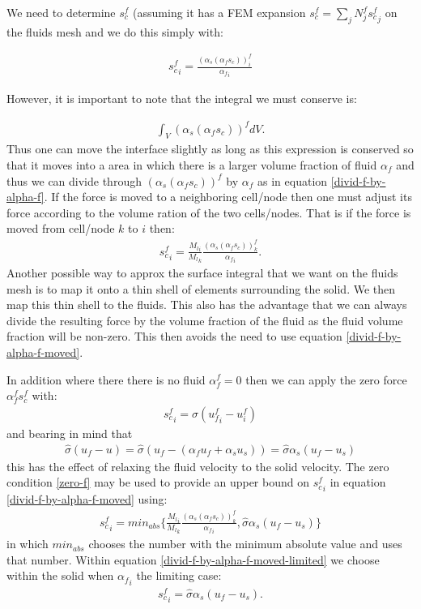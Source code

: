 We need to determine $s_c^f$ (assuming it has a FEM expansion 
$s_c^f=\sum_j N_j^f {s_c^f}_j$ on the fluids mesh and we 
do this simply with: 

\begin{eqnarray}
{s_c^f}_i= \frac{(\alpha_s(\alpha_f s_c))^f_i}{{\alpha_f}_i}
\label{divid-f-by-alpha-f}
\end{eqnarray}

However, it is important to note that the integral we 
must conserve is: 

\begin{eqnarray}
\int_V (\alpha_s(\alpha_f s_c))^f dV.
\end{eqnarray}
Thus one can move the interface slightly as long as this expression 
is conserved so that it moves into a area in which there is a 
larger volume fraction of fluid $\alpha_f$ and thus we 
can divide through $(\alpha_s(\alpha_f s_c))^f$ by $\alpha_f$ as in equation 
\ref{divid-f-by-alpha-f}. If the force is moved to a neighboring cell/node 
then one must adjust its force according to the volume ration 
of the two cells/nodes. That is if the force is moved 
from cell/node $k$ to $i$ then: 
\begin{eqnarray}
{s_c^f}_i= \frac{{M_l}_i}{{M_l}_k} \frac{(\alpha_s(\alpha_f s_c))^f_k}{{\alpha_f}_i}. 
\label{divid-f-by-alpha-f-moved}
\end{eqnarray}
Another possible way to approx the surface integral that we want on the 
fluids mesh is to map it onto a thin shell of elements surrounding the solid. 
We then map this thin shell to the fluids. 
This also has the advantage that we can always divide the resulting force by the 
volume fraction of the fluid as the fluid volume fraction will be non-zero. 
This then avoids the need to use equation \ref{divid-f-by-alpha-f-moved}. 


In addition where there there is no fluid $\alpha^f_f=0$ then 
we can apply the zero force $\alpha^f_f s_c^f$ with:
\begin{eqnarray}
{s_c^f}_i= \hat\sigma ({u^f_f}_i-u^f_i)
\label{zero-f}
\end{eqnarray}
and bearing in mind that 
\begin{eqnarray}
\hat\sigma (u_f-u)
= \hat\sigma (u_f - (\alpha_f u_f +\alpha_s u_s) ) 
= \hat\sigma \alpha_s(u_f-u_s) 
\end{eqnarray}
this has the effect of relaxing 
the fluid velocity to the solid velocity. 
The zero condition \ref{zero-f} 
may be used to provide an upper bound 
on ${s_c^f}_i$ in equation \ref{divid-f-by-alpha-f-moved} using: 
\begin{eqnarray}
{s_c^f}_i= min_{abs}\{ \frac{{M_l}_i}{{M_l}_k} \frac{(\alpha_s(\alpha_f s_c))^f_k}{{\alpha_f}_i},  \hat\sigma \alpha_s(u_f-u_s)  \} 
\label{divid-f-by-alpha-f-moved-limited}
\end{eqnarray}
in which $min_{abs}$ chooses the number with the 
minimum absolute value and uses that number. 
Within equation \ref{divid-f-by-alpha-f-moved-limited} we choose 
within the solid when ${\alpha_f}_i$ the limiting case: 
\begin{eqnarray}
{s_c^f}_i=  \hat\sigma \alpha_s(u_f-u_s). 
\label{s-c-simple}
\end{eqnarray}


